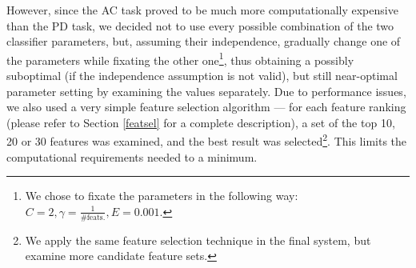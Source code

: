 \documentclass[12pt,notitlepage]{report}
\begin{document}
However, since the AC task proved to be much more computationally expensive than the PD task, we decided not to use every possible combination of the two classifier parameters, but, assuming their independence, gradually change one of the parameters while fixating the other one\footnote{We chose to fixate the parameters in the following way: $C = 2, \gamma = \frac{1}{\mbox{\#feats.}}, E = 0.001$.}, thus obtaining a possibly suboptimal (if the independence assumption is not valid), but still near-optimal parameter setting by examining the values separately. Due to performance issues, we also used a very simple feature selection algorithm --- for each feature ranking (please refer to Section \ref{featsel} for a complete description), a set of the top 10, 20 or 30 features was examined, and the best result was selected\footnote{We apply the same feature selection technique in the final system, but examine more candidate feature sets.}. This limits the computational requirements needed to a minimum.
\end{document}
